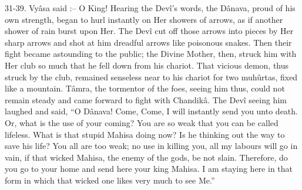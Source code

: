 31-39. Vy\^asa said :-- O King! Hearing the Dev\^i's words, the D\^anava, proud of his own strength, began to hurl instantly on Her showers of arrows, as if another shower of rain burst upon Her. The Dev\^i cut off those arrows into pieces by Her sharp arrows and shot at him dreadful arrows like poisonous snakes. Then their fight became astounding to the public; the Divine Mother, then, struck him with Her club so much that he fell down from his chariot. That vicious demon, thus struck by the club, remained senseless near to his chariot for two muh\^urtas, fixed like a mountain. T\^amra, the tormentor of the foes, seeing him thus, could not remain steady and came forward to fight with Chandik\^a. The Dev\^i seeing him laughed and said, ``O D\^anava! Come, Come, I will instantly send you unto death. Or, what is the use of your coming? You are so weak that you can be called lifeless. What is that stupid Mahisa doing now? Is he thinking out the way to save his life? You all are too weak; no use in killing you, all my labours will go in vain, if that wicked Mahisa, the enemy of the gods, be not slain. Therefore, do you go to your home and send here your king Mahisa. I am staying here in that form in which that wicked one likes very much to see Me.''

